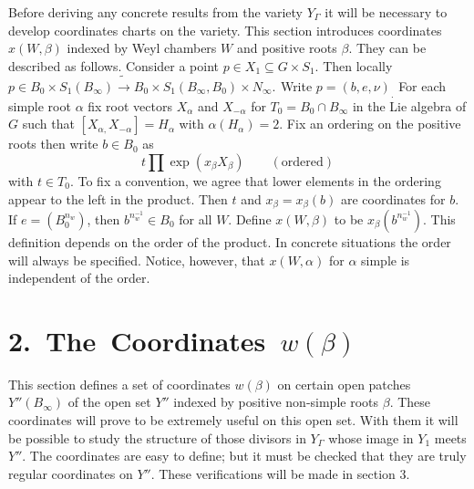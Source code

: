 \documentclass{memo-l}
\theoremstyle{definition}
\theoremstyle{remark}
\numberwithin{section}{chapter}
\numberwithin{equation}{chapter}
\begin{document}
Before deriving any concrete results from the variety $Y_{{\Gamma}}$ it will 
be necessary to develop coordinates charts on the variety. 
 This section introduces coordinates $x(W,{\beta})$ indexed by Weyl chambers 
$W$ and positive roots ${\beta}$. 
 They can be described as follows. 
 Consider a point $p \in X_{1} {\subseteq} G \times S_{1}$. 
 Then locally $p \in B_{0} \times S_{1}(B_{{\infty}}) \tilde{\to}  B_{0} 
\times S_{1}(B_{{\infty}},B_{0}) \times N_{{\infty}}._{ }$ Write 
$p = (b,e,{\nu})_{.}$  For each simple root ${\alpha}$ fix root vectors 
$X_{{\alpha}}$ and $X_{-{\alpha}}$ for $T_{0} = B_{0} {\cap} B_{{\infty}}$ 
in the Lie algebra of $G$ such that $[X_{{\alpha},}X_{-{\alpha}}] = 
H_{{\alpha}}$ with ${\alpha}(H_{{\alpha}})=2$. 
 Fix an ordering on the positive roots then write $b \in B_{0}$  as
$$
t \prod  \exp(x_{{\beta}}X_{{\beta}})\qquad  ({\text{ordered}})
$$
with $t \in T_{0}$. 
 To fix a convention, we agree that lower elements in the ordering appear 
to the left in the product. 
 Then $t$ and $x_{{\beta}} = x_{{\beta}}(b)$ are coordinates for $b$. 
  If $e = (B_{0}^{n_w})$, then $b^{n_w^{-1}} \in B_{0}$ for all $W$. 
 Define $x(W,{\beta})$ to be $x_{{\beta}}(b^{n_w^{-1}})$. 
 This definition depends on the order of the product. 
 In concrete situations the order will always be specified. 
 Notice, however, that $x(W,{\alpha})$ for ${\alpha}$ simple is independent 
of the order.

\section{ 2.\ The\ Coordinates\ $w({\beta})$ }

This section defines a set of coordinates $w({\beta})$ on certain open 
patches $Y''(B_{{\infty}})$ of the open set $Y''$ indexed by positive non-simple 
roots ${\beta}$. 
 These coordinates will prove to be extremely useful on this open set. 
 With them it will be possible to study the structure of those divisors in 
$Y_{{\Gamma}}$ whose image in $Y_{1}$ meets $Y''$. 
 The coordinates are easy to define; but it must be checked that they are 
truly regular coordinates on $Y''$. 
 These verifications will be made in section $3$.
\end{document}
